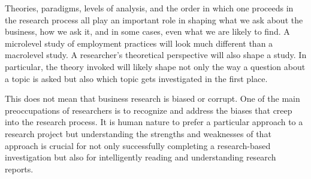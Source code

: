 Theories, paradigms, levels of analysis, and the order in which one proceeds in the research process all play an important role in shaping what we ask about the business, how we ask it, and in some cases, even what we are likely to find. A microlevel study of employment practices will look much different than a macrolevel study. A researcher's theoretical perspective will also shape a study. In particular, the theory invoked will likely shape not only the way a question about a topic is asked but also which topic gets investigated in the first place.

This does not mean that business research is biased or corrupt. One of the main preoccupations of researchers is to recognize and address the biases that creep into the research process. It is human nature to prefer a particular approach to a research project but understanding the strengths and weaknesses of that approach is crucial for not only successfully completing a research-based investigation but also for intelligently reading and understanding research reports.

